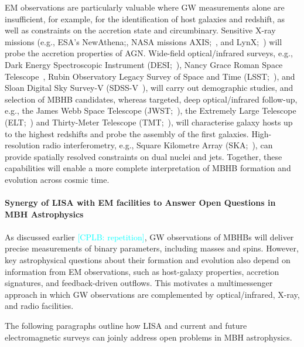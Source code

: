 \documentclass[a4paper,12pt]{article}
\newcommand{\cplb}[1]{\textcolor{cyan}{[CPLB: #1]}}
\begin{document}
EM observations are particularly valuable where GW measurements alone are insufficient, for example, for the identification of host galaxies and redshift, as well as constraints on the accretion state and circumbinary. Sensitive X-ray missions (e.g., ESA's NewAthena;\cite{cruise2025newathena}, NASA missions AXIS;~\cite{reynolds2023overview}, and LynX;~\cite{gaskin2019lynx}) will probe the accretion properties of AGN. Wide-field optical/infrared surveys, e.g., Dark Energy Spectroscopic Instrument (DESI;~\cite{aghamousa2016desi}), Nancy Grace Roman Space Telescope~\cite{akeson2019wide}, Rubin Observatory Legacy Survey of Space and Time (LSST;~\cite{ivezic2019lsst}), and Sloan Digital Sky Survey-V (SDSS-V~\cite{kollmeier2026sloan}), will carry out demographic studies, and selection of MBHB candidates, whereas targeted, deep optical/infrared follow-up, e.g., the James Webb Space Telescope (JWST;~\cite{gardner2006james}), the Extremely Large Telescope (ELT;~\cite{padovani2023extremely}) and Thirty-Meter Telescope (TMT;~\cite{skidmore2015thirty}), will characterise galaxy hosts up to the highest redshifts and probe the assembly of the first galaxies. High-resolution radio interferometry, e.g., Square Kilometre Array (SKA;~\cite{deane2015multiple}), can provide spatially resolved constraints on dual nuclei and jets. Together, these capabilities will enable a more complete interpretation of MBHB formation and evolution across cosmic time. 

\paragraph{Synergy of LISA with EM facilities to Answer Open Questions in MBH Astrophysics}

\paragraph{}
As discussed earlier \cplb{repetition},  GW observations of MBHBs will deliver precise measurements of binary parameters, including masses and spins. However, key astrophysical questions about their formation and evolution also depend on information from EM observations, such as host-galaxy properties, accretion signatures, and feedback-driven outflows. This motivates a multimessenger approach in which GW observations are complemented by optical/infrared, X-ray, and radio facilities.

The following paragraphs outline how LISA and current and future electromagnetic surveys can joinly address open problems in MBH astrophysics.
\end{document}
